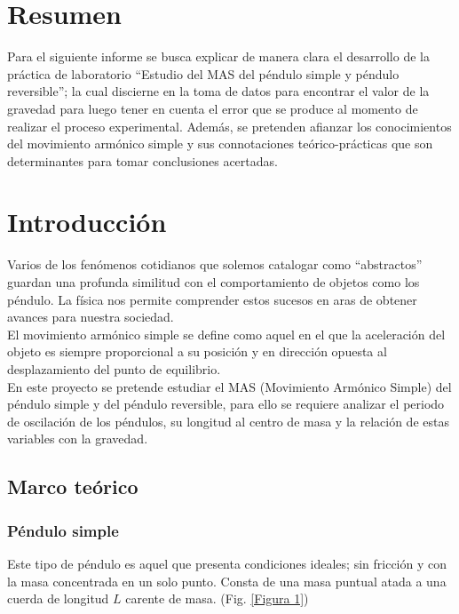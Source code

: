 \documentclass[spanish,notitlepage,letterpaper, 12pt]{article}
\begin{document}

\tableofcontents

\newpage

\section{Resumen}
Para el siguiente informe se busca explicar de manera clara el desarrollo de la práctica de laboratorio “Estudio del MAS del péndulo simple y péndulo reversible”; la cual discierne en la toma de datos para encontrar el valor de la gravedad para luego tener en cuenta el error que se produce al momento de realizar el proceso experimental. Además, se pretenden afianzar los conocimientos del movimiento armónico simple y sus connotaciones teórico-prácticas que son determinantes para tomar conclusiones acertadas.  

\section{Introducción}
Varios de los fenómenos cotidianos que solemos catalogar como \enquote{abstractos} guardan una profunda similitud con el comportamiento de objetos como los péndulo. La física nos permite comprender estos sucesos en aras de obtener avances para nuestra sociedad.\\

El movimiento armónico simple se define como aquel en el que la aceleración del objeto es siempre proporcional a su posición y en dirección opuesta al desplazamiento del punto de equilibrio. \cite{serway_jewett_2017}\\

En este proyecto se pretende estudiar el MAS (Movimiento Armónico Simple) del péndulo simple y del péndulo reversible, para ello se requiere analizar el periodo de oscilación de los péndulos, su longitud al centro de masa y la relación de estas variables con la gravedad.\\

\subsection{Marco teórico} \label{I.MT}
\subsubsection{Péndulo simple}
Este tipo de péndulo es aquel que presenta condiciones ideales; sin fricción y con la masa concentrada en un solo punto. Consta de una masa puntual atada a una cuerda de longitud $L$ carente de masa. (Fig. \ref{Figura 1}) 
\end{document}
